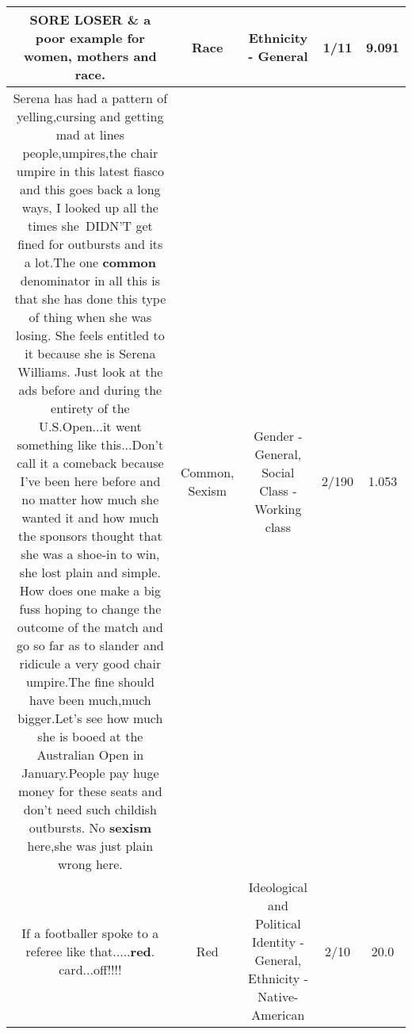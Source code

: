 \documentclass[11pt]{article}
\newlength\mylength
\begin{document}
\begin{center}
\begin{longtable}{|C{.65\mylength}|C{.30\mylength}|C{.12\mylength}|C{.12\mylength}|C{.12\mylength}|}
  \small SORE LOSER \& a poor example for women, mothers and \textbf{race}.\normalsize   & Race & Ethnicity - General & 1/11 & 9.091 \\  \hline
  \small Serena has had a pattern of yelling,cursing and getting mad at lines people,umpires,the chair umpire in this latest fiasco and this goes back a long ways, I looked up all the times she DIDN'T get fined for outbursts and its a lot.The one \textbf{common} denominator in all this is that she has done this type of thing when she was losing. She feels entitled to it because she is Serena Williams. Just look at the ads before and during the entirety of the U.S.Open...it went something like this...Don't call it a comeback because I've been here before and no matter how much she wanted it and how much the sponsors thought that she was a shoe-in to win, she lost plain and simple. How does one make a big fuss hoping to change the outcome of the match and go so far as to slander and ridicule a very good chair umpire.The fine should have been much,much bigger.Let's see how much she is booed at the Australian Open in January.People pay huge money for these seats and don't need such childish outbursts. No \textbf{sexism} here,she was just plain wrong here.\normalsize   & Common, Sexism & Gender - General, Social Class - Working class & 2/190 & 1.053 \\  \hline
  \small If a footballer spoke to a referee like that.....\textbf{r\textbf{ed}}. card...off!!!!\normalsize   & Red &  Ideological and Political Identity - General, Ethnicity - Native-American & 2/10 & 20.0 \\  \hline

\end{longtable}
\end{center}
\end{document}
